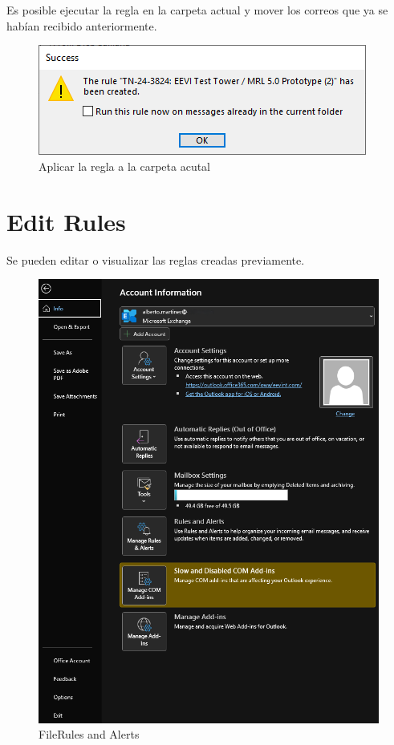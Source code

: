 \documentclass[12pt,letterpaper,final]{report}
\begin{document}
Es posible ejecutar la regla en la carpeta actual y mover los correos que ya se habían recibido anteriormente.

\begin{figure}[H]
	\centering
	\includegraphics[width=0.75\linewidth, height=0.35\textheight,keepaspectratio]{Imagenes/outlook_rules05}
	\caption{Aplicar la regla a la carpeta acutal}
	\label{fig:outlookrules05}
\end{figure}

\section{Edit Rules}

Se pueden editar o visualizar las reglas creadas previamente.

\begin{figure}[H]
	\centering
	\includegraphics[width=0.75\linewidth, height=0.45\textheight,keepaspectratio]{Imagenes/outlook_rules06}
	\caption{File\textrightarrow Rules and Alerts}
	\label{fig:outlookrules06}
\end{figure}
\end{document}
